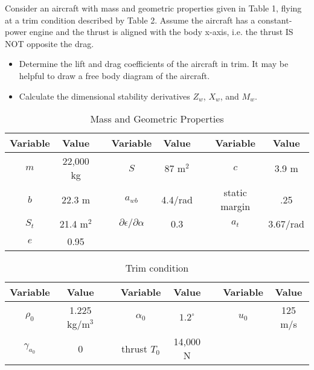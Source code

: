 \begin{question}
Consider an aircraft with mass and geometric properties given in Table 1, flying at a trim condition described by Table 2. Assume the aircraft has a constant-power engine and the thrust is aligned with the body x-axis, i.e. the thrust IS NOT opposite the drag.

\begin{itemize}
\item Determine the lift and drag coefficients of the aircraft in trim. It may be helpful to draw a free body diagram of the aircraft.
\item Calculate the dimensional stability derivatives $Z_w$, $X_w$, and $M_w$.
\end{itemize}

\begin{table}[ht] 
\caption{Mass and Geometric Properties} %
\centering %
\begin{tabular}{| c | c | c | c | c | c | c | c |} %
\hline %
Variable & Value & & Variable & Value & & Variable & Value\\ [0.5ex] %
\hline %
$m$ & 22,000 kg & & $S$ & 87 m$^2$ & & $c$ & 3.9 m \\
$b$ & 22.3 m & & $a_{wb}$ & 4.4/rad & & static margin & .25 \\
$S_t$ & 21.4 m$^2$ & & $\partial \epsilon / \partial \alpha$ & 0.3 & & $a_{t}$ & 3.67/rad \\
$e$ & 0.95 & & & & & &\\

\hline %
\end{tabular} 
\label{table:nonlin} %
\end{table}

\begin{table}[ht] 
\caption{Trim condition} %
\centering %
\begin{tabular}{| c | c | c | c | c | c | c | c |} %
\hline %
Variable & Value & & Variable & Value & & Variable & Value \\ [0.5ex] %
\hline %
$\rho_0$ & 1.225 kg/m$^3$ & & $\alpha_0$ & $1.2^{\circ}$ & & $u_0$ & 125 m/s \\
$\gamma_{a_0}$ & 0 & & thrust $T_0$ & 14,000 N & &  & \\
\hline %
\end{tabular} 
\label{table:nonlin} %
\end{table}
\end{question}
